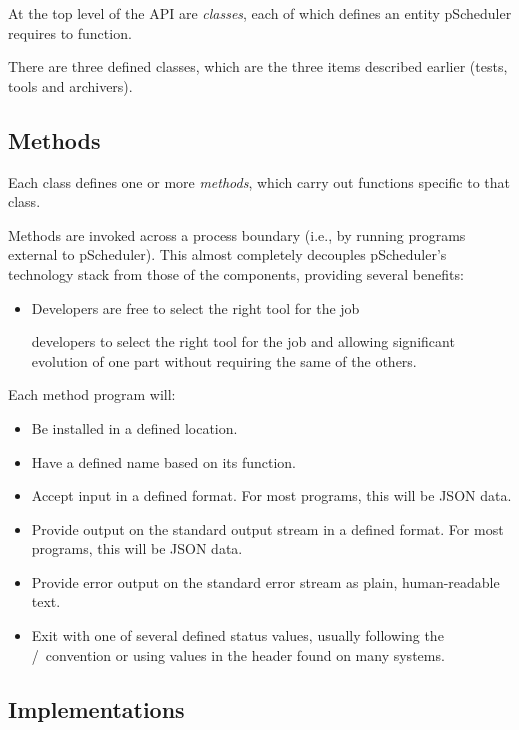 \documentclass[10pt,titlepage]{article}
\begin{document}
At the top level of the API are {\it classes}, each of which defines
an entity pScheduler requires to function.

There are three defined classes, which are the three items described
earlier (tests, tools and archivers).

\subsection{Methods}

Each class defines one or more {\it methods}, which carry out
functions specific to that class.

Methods are invoked across a process boundary (i.e., by running
programs external to pScheduler).  This almost completely decouples
pScheduler's technology stack from those of the components, providing
several benefits:

\begin{itemize}
\item Developers are free to select the right tool for the job 

developers to select the right tool for the job and allowing
significant evolution of one part without requiring the same of the
others.
\end{itemize}

Each method program will:

\begin{itemize}
\item Be installed in a defined location.
\item Have a defined name based on its function.
\item Accept input in a defined format.  For most programs, this will
  be JSON data.
\item Provide output on the standard output stream in a defined
  format.  For most programs, this will be JSON data.
\item Provide error output on the standard error stream as plain,
  human-readable text.
\item Exit with one of several defined status values, usually
  following the \true/\false\ convention or using values in
  the  header found on many systems.
\end{itemize}


\subsection{Implementations}
\end{document}
